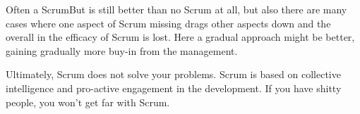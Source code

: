 \documentclass{abgabe}
\begin{document}
\begin{questions}
\begin{parts}
\begin{solution}
\begin{displayquote}
\begin{itemize}
                          Often a ScrumBut is still better than no Scrum at all, but also there are many cases where one aspect of Scrum missing drags other aspects down and the overall  in the efficacy of Scrum is lost. 
                          Here a gradual approach might be better, gaining gradually more buy-in from the management.
                \end{itemize}
                Ultimately, Scrum does not solve your problems. Scrum is based on collective intelligence and pro-active engagement in the development. If you have shitty people, you won't get far with Scrum.
            \end{displayquote}
        \end{solution}
    \end{parts}
\end{questions}
\end{document}
